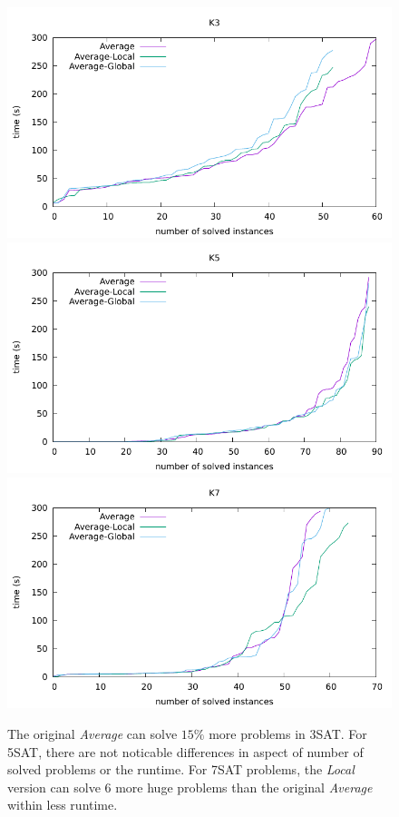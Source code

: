 \documentclass[12pt,a4paper,twoside]{scrartcl}
\numberwithin{equation}{section}
\begin{document}
  \begin{figure}[H]
\begin{center}
  \includegraphics[scale = 0.8]{DATA/K3/e3a.pdf}
    \includegraphics[scale = 0.8]{DATA/K5/e3a.pdf}
      \includegraphics[scale = 0.8]{DATA/K7/e3a.pdf}
  \end{center}
  \caption{ The original \emph{Average} can solve $15\%$ more problems in 3SAT. For 5SAT, there are not noticable differences in aspect of number of solved problems or the runtime. For 7SAT problems, the \emph{Local} version can solve $6$ more huge problems than the original \emph{Average} within less runtime.}
  \label{Experiment 4 k3 cactus plot}
  \end{figure}
\end{document}
